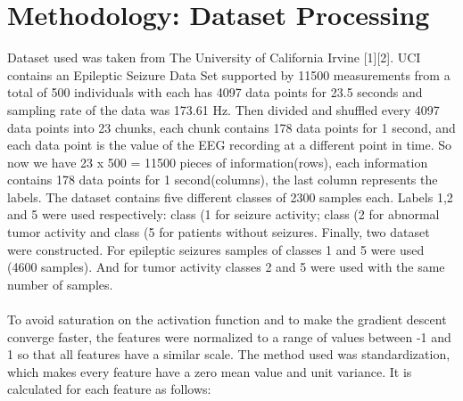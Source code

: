 \documentclass{llncs}       %
\begin{document}
\paragraph{}
\paragraph{}
\paragraph{}



\paragraph{}
\section{Methodology: Dataset Processing}
\label{sec:2}

Dataset used was taken from The University of California Irvine [1][2].  UCI contains an Epileptic Seizure Data Set supported by 11500 measurements from a total of 500 individuals with each has 4097 data points for 23.5 seconds and sampling rate of the data was 173.61 Hz. Then divided and shuffled every 4097 data points into 23 chunks, each chunk contains 178 data points for 1 second, and each data point is the value of the EEG recording at a different point in time. So now we have 23 x 500 = 11500 pieces of information(rows), each information contains 178 data points for 1 second(columns), the last column represents the labels.  The dataset contains five different classes of 2300 samples each. Labels 1,2 and 5 were used respectively: class (1 for seizure activity; class (2 for abnormal tumor activity and class (5 for patients without seizures.  Finally, two dataset were constructed.   For epileptic seizures samples of classes 1 and 5 were used (4600 samples).  And for tumor  activity classes 2 and 5 were used with the same number of samples.
   
\paragraph{}

To avoid saturation on the activation function and to make the gradient descent converge faster, the features were normalized to a range of values between -1 and 1 so that all features have a similar scale. The method used was standardization, which makes every feature have a zero mean value and unit variance. It is calculated for each feature as follows:
\end{document}
